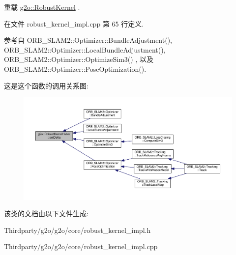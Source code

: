 重载 \hyperlink{classg2o_1_1RobustKernel_a8d85269635c436fca51324d7cb16a798}{g2o\-::\-Robust\-Kernel} .



在文件 robust\-\_\-kernel\-\_\-impl.\-cpp 第 65 行定义.



参考自 O\-R\-B\-\_\-\-S\-L\-A\-M2\-::\-Optimizer\-::\-Bundle\-Adjustment(), O\-R\-B\-\_\-\-S\-L\-A\-M2\-::\-Optimizer\-::\-Local\-Bundle\-Adjustment(), O\-R\-B\-\_\-\-S\-L\-A\-M2\-::\-Optimizer\-::\-Optimize\-Sim3() , 以及 O\-R\-B\-\_\-\-S\-L\-A\-M2\-::\-Optimizer\-::\-Pose\-Optimization().



这是这个函数的调用关系图\-:
\nopagebreak
\begin{figure}[H]
\begin{center}
\leavevmode
\includegraphics[width=350pt]{classg2o_1_1RobustKernelHuber_a7e9ee4bbc9483dcd3d10a4c1f506a4d2_icgraph}
\end{center}
\end{figure}




该类的文档由以下文件生成\-:\begin{DoxyCompactItemize}
\item 
Thirdparty/g2o/g2o/core/robust\-\_\-kernel\-\_\-impl.\-h\item 
Thirdparty/g2o/g2o/core/robust\-\_\-kernel\-\_\-impl.\-cpp\end{DoxyCompactItemize}
